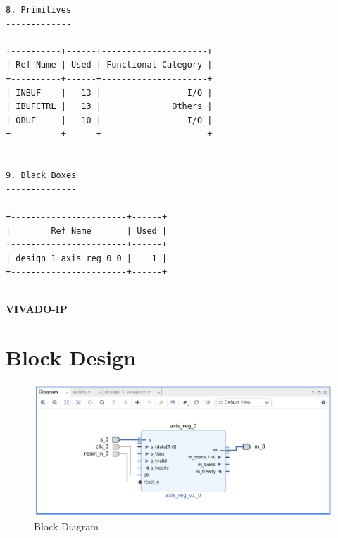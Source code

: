 \documentclass{article}
\begin{document}
\begin{lstlisting}
8. Primitives
-------------

+----------+------+---------------------+
| Ref Name | Used | Functional Category |
+----------+------+---------------------+
| INBUF    |   13 |                 I/O |
| IBUFCTRL |   13 |              Others |
| OBUF     |   10 |                 I/O |
+----------+------+---------------------+


9. Black Boxes
--------------

+-----------------------+------+
|        Ref Name       | Used |
+-----------------------+------+
| design_1_axis_reg_0_0 |    1 |
+-----------------------+------+


\end{lstlisting}
\vspace{12cm}


\maketitle
\hfill \textbf{VIVADO-IP}
\section{Block Design}
\vspace{1cm}
\begin{figure}[h]
    \centering
\includegraphics[width=\columnwidth]{figs/p2bd.png}
    \caption{Block Diagram}
    \label{fig:my_label}
\end{figure}
\vspace{13cm}
\end{document}

